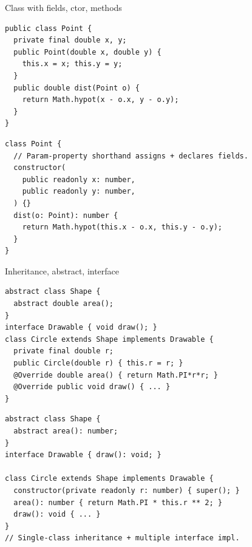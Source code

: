 \documentclass[10pt]{article}
\begin{document}

\begin{construct}{Class with fields, ctor, methods}
\noindent
\begin{minipage}[t]{0.485\linewidth}
\begin{lstlisting}[style=java, title=Java]
public class Point {
  private final double x, y;
  public Point(double x, double y) {
    this.x = x; this.y = y;
  }
  public double dist(Point o) {
    return Math.hypot(x - o.x, y - o.y);
  }
}
\end{lstlisting}
\end{minipage}\hfill
\begin{minipage}[t]{0.485\linewidth}
\begin{lstlisting}[style=ts, title=TypeScript]
class Point {
  // Param-property shorthand assigns + declares fields.
  constructor(
    public readonly x: number,
    public readonly y: number,
  ) {}
  dist(o: Point): number {
    return Math.hypot(this.x - o.x, this.y - o.y);
  }
}
\end{lstlisting}
\end{minipage}
\end{construct}

\begin{construct}{Inheritance, abstract, interface}
\noindent
\begin{minipage}[t]{0.485\linewidth}
\begin{lstlisting}[style=java, title=Java]
abstract class Shape {
  abstract double area();
}
interface Drawable { void draw(); }
class Circle extends Shape implements Drawable {
  private final double r;
  public Circle(double r) { this.r = r; }
  @Override double area() { return Math.PI*r*r; }
  @Override public void draw() { ... }
}
\end{lstlisting}
\end{minipage}\hfill
\begin{minipage}[t]{0.485\linewidth}
\begin{lstlisting}[style=ts, title=TypeScript]
abstract class Shape {
  abstract area(): number;
}
interface Drawable { draw(): void; }

class Circle extends Shape implements Drawable {
  constructor(private readonly r: number) { super(); }
  area(): number { return Math.PI * this.r ** 2; }
  draw(): void { ... }
}
// Single-class inheritance + multiple interface impl.
\end{lstlisting}
\end{minipage}
\end{construct}
\end{document}

